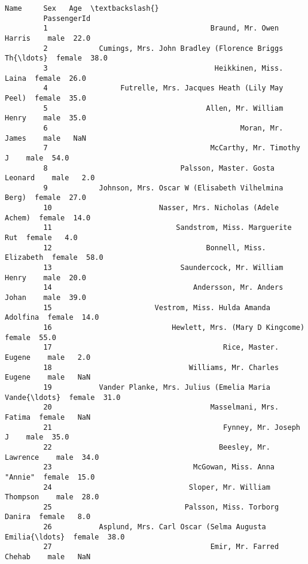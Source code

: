 \documentclass[11pt]{article}
\begin{document}
\begin{Verbatim}[commandchars=\\\{\}]
                                                                   Name     Sex   Age  \textbackslash{}
         PassengerId                                                                    
         1                                      Braund, Mr. Owen Harris    male  22.0   
         2            Cumings, Mrs. John Bradley (Florence Briggs Th{\ldots}  female  38.0   
         3                                       Heikkinen, Miss. Laina  female  26.0   
         4                 Futrelle, Mrs. Jacques Heath (Lily May Peel)  female  35.0   
         5                                     Allen, Mr. William Henry    male  35.0   
         6                                             Moran, Mr. James    male   NaN   
         7                                      McCarthy, Mr. Timothy J    male  54.0   
         8                               Palsson, Master. Gosta Leonard    male   2.0   
         9            Johnson, Mrs. Oscar W (Elisabeth Vilhelmina Berg)  female  27.0   
         10                         Nasser, Mrs. Nicholas (Adele Achem)  female  14.0   
         11                             Sandstrom, Miss. Marguerite Rut  female   4.0   
         12                                    Bonnell, Miss. Elizabeth  female  58.0   
         13                              Saundercock, Mr. William Henry    male  20.0   
         14                                 Andersson, Mr. Anders Johan    male  39.0   
         15                        Vestrom, Miss. Hulda Amanda Adolfina  female  14.0   
         16                            Hewlett, Mrs. (Mary D Kingcome)   female  55.0   
         17                                        Rice, Master. Eugene    male   2.0   
         18                                Williams, Mr. Charles Eugene    male   NaN   
         19           Vander Planke, Mrs. Julius (Emelia Maria Vande{\ldots}  female  31.0   
         20                                     Masselmani, Mrs. Fatima  female   NaN   
         21                                        Fynney, Mr. Joseph J    male  35.0   
         22                                       Beesley, Mr. Lawrence    male  34.0   
         23                                 McGowan, Miss. Anna "Annie"  female  15.0   
         24                                Sloper, Mr. William Thompson    male  28.0   
         25                               Palsson, Miss. Torborg Danira  female   8.0   
         26           Asplund, Mrs. Carl Oscar (Selma Augusta Emilia{\ldots}  female  38.0   
         27                                     Emir, Mr. Farred Chehab    male   NaN   

\end{Verbatim}
\end{document}
